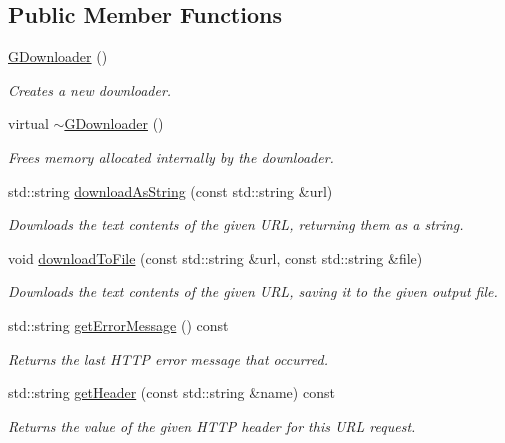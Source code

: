 \subsection*{Public Member Functions}
\begin{DoxyCompactItemize}
\item 
\mbox{\hyperlink{classGDownloader_a03a6336ad3aebf9d5904c50ce0cdc1dc}{G\+Downloader}} ()
\begin{DoxyCompactList}\small\item\em Creates a new downloader. \end{DoxyCompactList}\item 
virtual \mbox{\hyperlink{classGDownloader_a6a9f476cb937e98d417d8ab43b8cd8d5}{$\sim$\+G\+Downloader}} ()
\begin{DoxyCompactList}\small\item\em Frees memory allocated internally by the downloader. \end{DoxyCompactList}\item 
std\+::string \mbox{\hyperlink{classGDownloader_a27b002ce17000e199302c608363c97a2}{download\+As\+String}} (const std\+::string \&url)
\begin{DoxyCompactList}\small\item\em Downloads the text contents of the given U\+RL, returning them as a string. \end{DoxyCompactList}\item 
void \mbox{\hyperlink{classGDownloader_a0bf57f044cc66c8aab40f3f2179caf21}{download\+To\+File}} (const std\+::string \&url, const std\+::string \&file)
\begin{DoxyCompactList}\small\item\em Downloads the text contents of the given U\+RL, saving it to the given output file. \end{DoxyCompactList}\item 
std\+::string \mbox{\hyperlink{classGDownloader_adf0cc934eff26878cdf2018259997a4a}{get\+Error\+Message}} () const
\begin{DoxyCompactList}\small\item\em Returns the last H\+T\+TP error message that occurred. \end{DoxyCompactList}\item 
std\+::string \mbox{\hyperlink{classGDownloader_a736d777b29179f52ba753317d84b1087}{get\+Header}} (const std\+::string \&name) const
\begin{DoxyCompactList}\small\item\em Returns the value of the given H\+T\+TP header for this U\+RL request. \end{DoxyCompactList}\item 

\end{DoxyCompactItemize}
